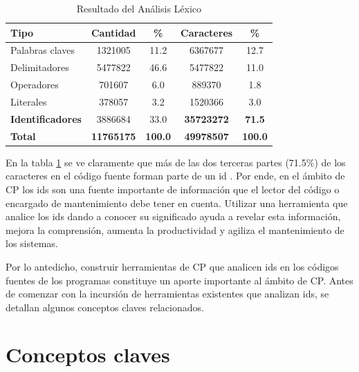 \documentclass[a4paper,12pt]{report}
\begin{document}
\begin{center}
	\begin{table}[h]
	
		\centering
   		\begin{tabular}{| l | c | c | c | c | }  
       
       \hline
  	   \textsf{Tipo} & \textsf{Cantidad} & \textsf{\%} & \textsf{Caracteres} & \textsf{\%} \\ \hline
  	   Palabras claves & 1321005 & 11.2 & 6367677 & 12.7 \\ \hline
   	   Delimitadores & 5477822 & 46.6 & 5477822 & 11.0 \\ \hline
       Operadores & 701607 & 6.0 & 889370 & 1.8 \\ \hline
       Literales & 378057 & 3.2 & 1520366 & 3.0 \\ \hline          
       \textbf{Identificadores} & 3886684 & 33.0 & \textbf{35723272} & \textbf{71.5} \\ \hline
       \textbf{Total} & \textbf{11765175} & \textbf{100.0} & \textbf{49978507} & \textbf{100.0} \\ \hline
     
   	\end{tabular}
   
	\label{tabla1}   
   \caption{Resultado del Análisis Léxico}
   
  \end{table} 
\end{center}

\vspace{-2.5em}

En la tabla \ref{tabla1} se ve claramente que más de las dos terceras partes (71.5\%) de los caracteres en el código fuente forman parte de un id \cite{DFPM05,DMDJ13}. 
Por ende, en el ámbito de CP los ids son una fuente importante de información que el lector del código o encargado de mantenimiento debe tener en cuenta. Utilizar una herramienta que analice los ids dando a conocer su significado ayuda a revelar esta información, mejora la comprensión, aumenta la productividad y agiliza el mantenimiento de los sistemas.

Por lo antedicho, construir herramientas de CP que analicen ids en los códigos fuentes de los programas constituye un aporte importante al ámbito de CP. Antes de comenzar con la incursión de herramientas existentes que analizan ids, se detallan algunos conceptos claves relacionados.

\section{Conceptos claves}
\end{document}
